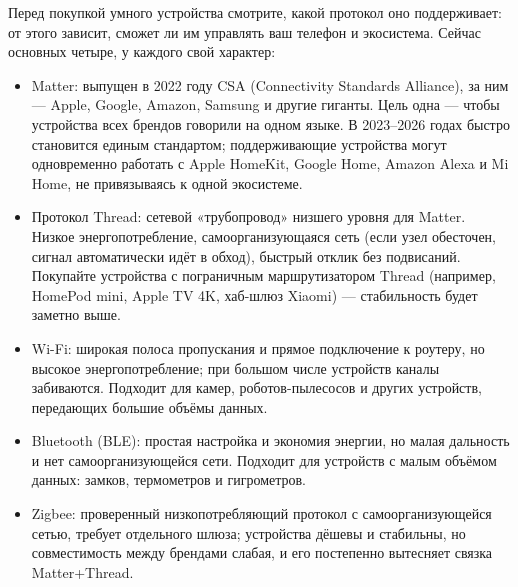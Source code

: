 


Перед покупкой умного устройства смотрите, какой протокол оно поддерживает: от этого зависит, сможет ли им управлять ваш телефон и экосистема. Сейчас основных четыре, у каждого свой характер:

\begin{itemize}
  \item Matter: выпущен в 2022 году CSA (Connectivity Standards Alliance), за ним — Apple, Google, Amazon, Samsung и другие гиганты. Цель одна — чтобы устройства всех брендов говорили на одном языке. В 2023–2026 годах быстро становится единым стандартом; поддерживающие устройства могут одновременно работать с Apple HomeKit, Google Home, Amazon Alexa и Mi Home, не привязываясь к одной экосистеме.
  \item Протокол Thread: сетевой «трубопровод» низшего уровня для Matter. Низкое энергопотребление, самоорганизующаяся сеть (если узел обесточен, сигнал автоматически идёт в обход), быстрый отклик без подвисаний. Покупайте устройства с пограничным маршрутизатором Thread (например, HomePod mini, Apple TV 4K, хаб-шлюз Xiaomi) — стабильность будет заметно выше.
  \item Wi-Fi: широкая полоса пропускания и прямое подключение к роутеру, но высокое энергопотребление; при большом числе устройств каналы забиваются. Подходит для камер, роботов-пылесосов и других устройств, передающих большие объёмы данных.
  \item Bluetooth (BLE): простая настройка и экономия энергии, но малая дальность и нет самоорганизующейся сети. Подходит для устройств с малым объёмом данных: замков, термометров и гигрометров.
  \item Zigbee: проверенный низкопотребляющий протокол с самоорганизующейся сетью, требует отдельного шлюза; устройства дёшевы и стабильны, но совместимость между брендами слабая, и его постепенно вытесняет связка Matter+Thread.
\end{itemize}

